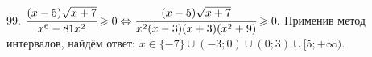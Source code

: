 99. $\cfrac{(x-5)\sqrt{x+7}}{x^6-81x^2}\geqslant0\Leftrightarrow
\cfrac{(x-5)\sqrt{x+7}}{x^2(x-3)(x+3)(x^2+9)}\geqslant0.$ Применив метод интервалов, найдём ответ: $x\in\{-7\}\cup(-3;0)\cup(0;3)\cup[5;+\infty).$
\begin{figure}[ht!]
\end{figure}\\
